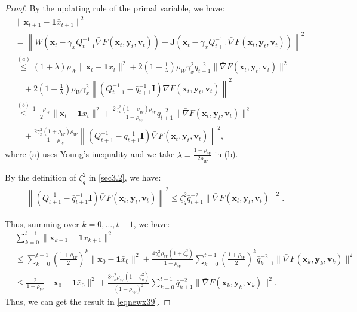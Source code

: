 \documentclass{article}
\theoremstyle{plain}
\theoremstyle{definition}
\theoremstyle{remark}
\begin{document}
\begin{proof}
By the updating rule of the primal variable, we have:
\begin{align}
&\|\mathbf{x}_{t+1} - \mathbf{1} \bar{x}_{t+1} \|^2\nonumber\\
&= \left\| W \left( \mathbf{x}_t - \gamma_x Q_{t+1}^{-1} \bar{\nabla} F(\mathbf{x}_t, \mathbf{y}_t, \mathbf{v}_t) \right) 
- \mathbf{J} \left( \mathbf{x}_t - \gamma_x Q_{t+1}^{-1} \bar{\nabla} F(\mathbf{x}_t, \mathbf{y}_t, \mathbf{v}_t) \right) \right\|^2 \nonumber \\
&\overset{(a)}{\leq} (1 + \lambda) \rho_W  \|\mathbf{x}_t - \mathbf{1} \bar{x}_t\|^2
+2 \left( 1 + \frac{1}{\lambda} \right)\rho_W  \gamma_x^2 \bar{q}_{t+1}^{-2} \|\bar{\nabla} F(\mathbf{x}_t, \mathbf{y}_t, \mathbf{v}_t) \|^2 \nonumber \\
&\quad + 2\left( 1 + \frac{1}{\lambda} \right)\rho_W  \gamma_x^2  
 \left\| \left(Q_{t+1}^{-1} - \bar{q}_{t+1}^{-1} \mathbf{I} \right) \bar{\nabla} F(\mathbf{x}_t, \mathbf{y}_t, \mathbf{v}_t) \right\|^2\nonumber\\
&\overset{(b)}{\leq} \frac{1 + \rho_W}{2}  \|\mathbf{x}_t - \mathbf{1} \bar{x}_t\|^2 
+ \frac{2 \gamma_x^2 (1 + \rho_W) \rho_W}{1 - \rho_W} \bar{q}_{t+1}^{-2} \|\bar{\nabla} F(\mathbf{x}_t, \mathbf{y}_t, \mathbf{v}_t) \|^2 \nonumber \\
&\quad + \frac{2 \gamma_x^2 (1 + \rho_W) \rho_W}{1 - \rho_W} 
 \left\| \left(Q_{t+1}^{-1} - \bar{q}_{t+1}^{-1} \mathbf{I} \right) \bar{\nabla} F(\mathbf{x}_t, \mathbf{y}_t, \mathbf{v}_t) \right\|^2, \label{eq40}
\end{align}
where (a) uses Young's inequality and we take $\lambda=\frac{1-\rho_W}{2\rho_W}$ in (b).

By the definition of \(\zeta_q^2\) in \cref{sec3.2}, we have:
\begin{align}
\left\| \left( Q_{t+1}^{-1} - \bar{q}_{t+1}^{-1} \mathbf{I} \right) \bar{\nabla} F(\mathbf{x}_t, \mathbf{y}_t, \mathbf{v}_t) \right\|^2  
\leq \zeta_q^2 \bar{q}_{t+1}^{-2} \|\bar{\nabla} F(\mathbf{x}_t, \mathbf{y}_t, \mathbf{v}_t)\|^2.\label{eq41}
\end{align}

Thus, summing over \(k = 0, \ldots, t-1\), we have:
\begin{align}
&\sum_{k=0}^{t-1} \|\mathbf{x}_{k+1} - \mathbf{1} \bar{x}_{k+1} \|^2 \nonumber\\
&\leq \sum_{k=0}^{t-1}\left(\frac{1 + \rho_W}{2} \right)^k \|\mathbf{x}_0 - \mathbf{1} \bar{x}_0\|^2 
+ \frac{4 \gamma_x^2 \rho_W(1 + \zeta_q^2)}{1 - \rho_W}\sum_{k=0}^{t-1} \left(\frac{1 + \rho_W}{2} \right)^k\bar{q}_{k+1}^{-2} \|\bar{\nabla} F(\mathbf{x}_k, \mathbf{y}_k, \mathbf{v}_k) \|^2\nonumber\\
&\leq \frac{2}{1 - \rho_W} \|\mathbf{x}_0 - \mathbf{1} \bar{x}_0\|^2 
+ \frac{8 \gamma_x^2 \rho_W (1 + \zeta_q^2)}{(1 - \rho_W)^2} \sum_{k=0}^{t-1} 
 \bar{q}_{k+1}^{-2} \|\bar{\nabla}F(\mathbf{x}_k, \mathbf{y}_k, \mathbf{v}_k)\|^2.\label{eq42}
\end{align}
Thus, we can get the result in \cref{eqnewx39}.
\end{proof}
\end{document}

